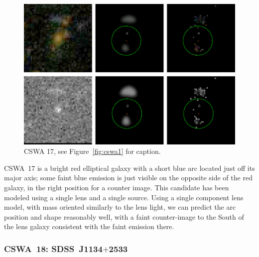 \documentclass[iop]{emulateapj}
\begin{document}
\begin{figure}[!ht]
	\centering\includegraphics[width=\linewidth]{figs/17.eps}
	\caption{CSWA 17, see Figure~\ref{fig:cswa1} for caption.}
	\label{fig:cswa17}
\end{figure}

CSWA~17 is a bright red elliptical galaxy with a short blue arc located just off
its major axis; some faint blue emission is just visible on the opposite side of
the red galaxy, in the right position for a counter image. This candidate has
been modeled using a single lens and a single source. Using a single component
lens model, with mass oriented similarly to the lens light, we can predict the
arc position and shape reasonably well, with a faint counter-image to the South
of the lens galaxy consistent with the faint emission there. 



\subsubsection*{CSWA~18: SDSS\ J1134$+$2533}
\label{sec:results:indinotes:cswa18}

\end{document}
